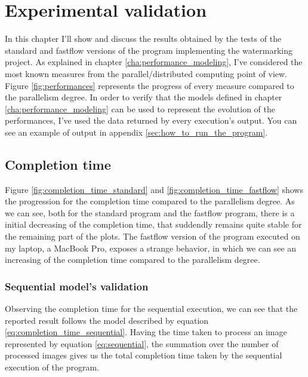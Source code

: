 \chapter{Experimental validation} %
\label{cha:experimental_validation}
    In this chapter I'll show and discuss the results obtained by the tests of the standard and fastflow
    versions of the program implementing the watermarking project. As explained in chapter
    \ref{cha:performance_modeling}, I've considered the most known measures from the parallel/distributed
    computing point of view. Figure \ref{fig:performances} represents the progress of every measure compared
    to the parallelism degree. In order to verify that the models defined in chapter
    \ref{cha:performance_modeling} can be used to represent the evolution of the performances, I've used the
    data returned by every execution's output. You can see an example of output in appendix
    \ref{sec:how_to_run_the_program}.
    \section{Completion time} %
    \label{sec:completion_time}
        Figure \ref{fig:completion_time_standard} and \ref{fig:completion_time_fastflow} shows the progression
        for the completion time compared to the parallelism degree. As we can see, both for the standard program
        and the fastflow program, there is a initial decreasing of the completion time, that suddendly remains
        quite stable for the remaining part of the plots. The fastflow version of the program executed on my
        laptop, a MacBook Pro, exposes a strange behavior, in which we can see an increasing of the completion
        time compared to the parallelism degree.
        \subsection{Sequential model's validation} %
        \label{sub:sequential_model_s_validation}
            Observing the completion time for the sequential execution, we can see that the
            reported result follows the model described by equation \ref{eq:completion_time_sequential}. Having
            the time taken to process an image represented by equation \ref{eq:sequential}, the summation over
            the number of processed images gives us the total completion time taken by the sequential execution
            of the program.
